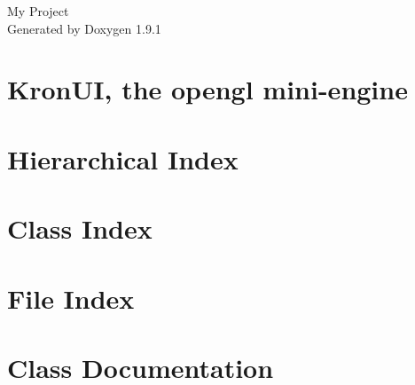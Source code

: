 \let\mypdfximage\pdfximage\def\pdfximage{\immediate\mypdfximage}\documentclass[twoside]{book}
\newcommand{\+}{\discretionary{\mbox{\scriptsize$\hookleftarrow$}}{}{}}
\newcommand{\clearemptydoublepage}{%
  \newpage{\pagestyle{empty}\cleardoublepage}%
}
\begin{document}
\raggedbottom

\hypersetup{pageanchor=false,
             bookmarksnumbered=true,
             pdfencoding=unicode
            }
\begin{titlepage}
\vspace*{7cm}
\begin{center}%
{\Large My Project }\\
\vspace*{1cm}
{\large Generated by Doxygen 1.9.1}\\
\end{center}
\end{titlepage}
\clearemptydoublepage
{}
\tableofcontents
\clearemptydoublepage
{}
\hypersetup{pageanchor=true}

\chapter{Kron\+UI, the opengl mini-\/engine}
\label{md_readme}

\chapter{Hierarchical Index}

\chapter{Class Index}

\chapter{File Index}

\chapter{Class Documentation}




























\end{document}
